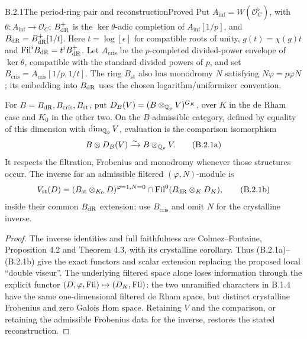 \begin{result}{B.2.1}{The period-ring pair and reconstruction}{Proved}
Put $A_{\inf}=W(\mathcal O_C^\flat)$, with
$\theta:A_{\inf}\to\mathcal O_C$;
$B_{\mathrm{dR}}^+$ is the $\ker\theta$-adic completion of $A_{\inf}[1/p]$,
and $B_{\mathrm{dR}}=B_{\mathrm{dR}}^+[1/t]$. Here
$t=\log[\epsilon]$ for compatible roots of unity,
$g(t)=\chi(g)t$ and $\mathrm{Fil}^iB_{\mathrm{dR}}=t^iB_{\mathrm{dR}}^+$.
Let $A_{\mathrm{cris}}$ be the $p$-completed divided-power envelope
of $\ker\theta$, compatible with the standard divided powers of
$p$, and set $B_{\mathrm{cris}}=A_{\mathrm{cris}}[1/p,1/t]$.
The ring $B_{\mathrm{st}}$ also has monodromy $N$ satisfying
$N\varphi=p\varphi N$; its embedding into $B_{\mathrm{dR}}$ uses the
chosen logarithm/uniformizer convention.

For $B=B_{\mathrm{dR}},B_{\mathrm{cris}},B_{\mathrm{st}}$, put
$D_B(V)=(B\otimes_{\mathbb Q_p}V)^{G_K}$, over $K$ in the de Rham case
and $K_0$ in the other two. On the $B$-admissible category,
defined by equality of this dimension with $\dim_{\mathbb Q_p}V$,
evaluation is the comparison isomorphism
\[
           B\otimes D_B(V)\xrightarrow{\sim}B\otimes_{\mathbb Q_p}V.
 \tag{B.2.1a}
\]
It respects the filtration, Frobenius and monodromy whenever
those structures occur. The inverse for an admissible filtered
$(\varphi,N)$-module is
\[
 V_{\mathrm{st}}(D)=
  (B_{\mathrm{st}}\otimes_{K_0}D)^{\varphi=1,N=0}
  \cap\mathrm{Fil}^0(B_{\mathrm{dR}}\otimes_KD_K),
 \tag{B.2.1b}
\]
inside their common $B_{\mathrm{dR}}$ extension; use $B_{\mathrm{cris}}$
and omit $N$ for the crystalline inverse.
\end{result}
\begin{proof}
The inverse identities and full faithfulness are
Colmez--Fontaine, Proposition 4.2 and Theorem 4.3, with its
crystalline corollary. Thus (B.2.1a)--(B.2.1b) give the exact
functors and scalar extension replacing the proposed local
``double viseur''. The underlying filtered space alone loses
information through the explicit functor
$(D,\varphi,\mathrm{Fil})\mapsto(D_K,\mathrm{Fil})$: the two unramified
characters in B.1.4 have the same one-dimensional filtered de
Rham space, but distinct crystalline Frobenius and zero Galois
Hom space. Retaining $V$ and the comparison, or retaining the
admissible Frobenius data for the inverse, restores the stated
reconstruction.
\end{proof}

